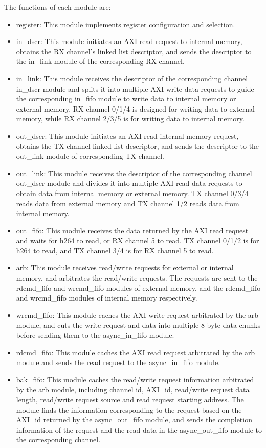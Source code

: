 \documentclass[main\_\_EN.tex]{subfiles}
\begin{document}
The functions of each module are:
\begin{itemize}
    \item register: This module implements register configuration and selection.
    \item in\_dscr: This module initiates an AXI read request to internal memory, obtains the RX channel's linked list descriptor, and sends the descriptor to the in\_link module of the corresponding RX channel.
    \item in\_link: This module receives the descriptor of the corresponding channel in\_dscr module and splits it into multiple AXI write data requests to guide the corresponding in\_fifo module to write data to internal memory or external memory. RX channel 0/1/4 is designed for writing data to external memory, while RX channel 2/3/5 is for writing data to internal memory.
    \item out\_dscr: This module initiates an AXI read internal memory request, obtains the TX channel linked list descriptor, and sends the descriptor to the out\_link module of corresponding TX channel.
    \item out\_link: This module receives the descriptor of the corresponding channel out\_dscr module and divides it into multiple AXI read data requests to obtain data from internal memory or external memory. TX channel 0/3/4 reads data from external memory and TX channel 1/2 reads data from internal memory.
    \item out\_fifo: This module receives the data returned by the AXI read request and waits for h264 to read, or RX channel 5 to read. TX channel 0/1/2 is for h264 to read, and TX channel 3/4 is for RX channel 5 to read.
    \item arb: This module receives read/write requests for external or internal memory, and arbitrates the read/write requests. The requests are sent to the rdcmd\_fifo and wrcmd\_fifo modules of external memory, and the rdcmd\_fifo and wrcmd\_fifo modules of internal memory respectively.
    \item wrcmd\_fifo: This module caches the AXI write request arbitrated by the arb module, and cuts the write request and data into multiple 8-byte data chunks before sending them to the async\_in\_fifo module.
    \item rdcmd\_fifo: This module caches the AXI read request arbitrated by the arb module and sends the read request to the async\_in\_fifo module.
    \item bak\_fifo: This module caches the read/write request information arbitrated by the arb module, including channel id, AXI\_id, read/write request data length, read/write request source and read request starting address. The module finds the information corresponding to the request based on the AXI\_id returned by the async\_out\_fifo module, and sends the completion information of the request and the read data in the async\_out\_fifo module to the corresponding channel.

\end{itemize}
\end{document}
